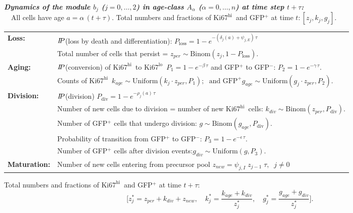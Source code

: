\documentclass[11pt]{article}
\newcommand{\khi}{\ensuremath{\text{Ki67}^\text{hi}}~}
\newcommand{\klo}{\ensuremath{\text{Ki67}^\text{lo}}~}
\newcommand\prob{$I\kern-0.25em P$}
\begin{document}
\vspace{2mm}
\begin{mybox}
\textbf{\textit{Dynamics of the module $b_j$ ($j = 0,\ldots,2$) in age-class $A_\alpha$ ($\alpha = 0,\ldots,n$) at time step $t+\tau$:}} \\

\vspace{-3mm}
~~All cells have age $a= \alpha\, (t+\tau)$. 
Total numbers and fractions of \khi and GFP$^+$ at time $t: [z_j, k_j, g_j]$.  \\

\begin{tabular}{ll}
    \textbf{Loss:}  &\prob(loss by death and differentiation): $P_\text{loss}= 1 - e^{-(\delta_{j}(a) + \psi_{j, E}) \, \tau}$ \\
    &Total number of cells that persist =  $z_{per} \sim \text{Binom}(z_j, 1- P_\text{loss})$. \\
    \textbf{Aging:}  & \prob(conversion) of \khi to \klo $P_1=1 - e^{-\beta \, \tau}$  and  GFP$^+$ to GFP$^-$:  $P_2=1 - e^{-\gamma \, \tau}$.\\ %
    &Counts of \khi   $k_{age} \sim \text{Uniform}(k_j \cdot z_{per},  P_{1}); \; \text{ and GFP}^+  g_{age} \sim \text{Uniform}(g_j \cdot z_{per},  P_{2})$.\\
    \textbf{Division:}  &\prob(division) $P_\text{div}= 1 - e^{-\rho_{j}(a) \, \tau}$ \\
    &Number of new cells due to division = number of new \khi cells: $k_{div} \sim \text{Binom}(z_{per} , P_\text{div})$. \\
    &Number of GFP$^+$ cells that undergo division: $g \sim \text{Binom}(g_{age}, P_\text{div})$. \\
    &Probability of transition from GFP$^+$ to GFP$^-$: $P_3=1 - e^{-\epsilon \, \tau}$.\\
    &Number of GFP$^+$ cells after division events:$g_{div} \sim \text{Uniform}(g,  P_3)$.\\ 
    \textbf{Maturation:}  &Number of new cells entering from precursor pool $z_{new} =  \psi_{j, I} \; z_{j-1} \; \tau,  \;\; j\neq0$ \\
\end{tabular}

\vspace{1mm}
Total numbers and fractions of \khi and GFP$^+$ at time $t+\tau:$
$$\bigg[ z_{j}^* = z_{per} + k_{div} + z_{new}, \quad k_j^* = \frac{k_{age} + k_{div}}{z_{j}^*}, \quad g_j^* = \frac{ g_{age} + g_{div}}{z_{j}^*}\bigg].$$

\end{mybox}
\end{document}

